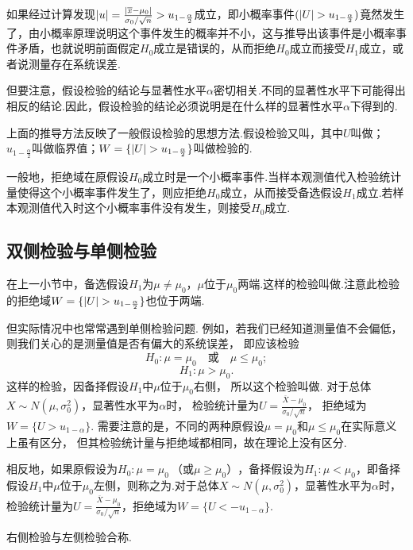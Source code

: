 如果经过计算发现\(\abs{u}=\frac{\abs{\overline{x}-\mu_0}}{\sigma_0 / \sqrt{n}}>u_{1-\frac{\alpha}{2}}\)成立，即小概率事件\((\abs{U}>u_{1-\frac{\alpha}{2}})\)竟然发生了，由小概率原理说明这个事件发生的概率并不小，这与推导出该事件是小概率事件矛盾，也就说明前面假定\(H_0\)成立是错误的，从而拒绝\(H_0\)成立而接受\(H_1\)成立，或者说测量存在系统误差.

但要注意，假设检验的结论与显著性水平\(\alpha\)密切相关.不同的显著性水平下可能得出相反的结论.因此，假设检验的结论必须说明是在什么样的显著性水平\(\alpha\)下得到的.

上面的推导方法反映了一般假设检验的思想方法.假设检验又叫，其中\(U\)叫做；\(u_{1-\frac{\alpha}{2}}\)叫做临界值；\(W=\{\abs{U}>u_{1-\frac{\alpha}{2}}\}\)叫做检验的.

一般地，拒绝域在原假设\(H_0\)成立时是一个小概率事件.当样本观测值代入检验统计量使得这个小概率事件发生了，则应拒绝\(H_0\)成立，从而接受备选假设\(H_1\)成立.若样本观测值代入时这个小概率事件没有发生，则接受\(H_0\)成立.

\subsection{双侧检验与单侧检验}
在上一小节中，备选假设\(H_1\)为\(\mu\neq\mu_0\)，\(\mu\)位于\(\mu_0\)两端.这样的检验叫做.注意此检验的拒绝域\(W=\{\abs{U}>u_{1-\frac{\alpha}{2}}\}\)也位于两端.

但实际情况中也常常遇到单侧检验问题.
例如，若我们已经知道测量值不会偏低，
则我们关心的是测量值是否有偏大的系统误差，
即应该检验\[
	H_0: \mu=\mu_0
	\quad\text{或}\quad
	\mu\leq\mu_0;
\]\[
	H_1: \mu>\mu_0.
\]
这样的检验，因备择假设\(H_1\)中\(\mu\)位于\(\mu_0\)右侧，
所以这个检验叫做.
对于总体\(X \sim N(\mu,\sigma_0^2)\)，显著性水平为\(\alpha\)时，
检验统计量为\(U = \frac{\overline{X}-\mu_0}{\sigma_0 / \sqrt{n}}\)，
拒绝域为\(W=\{U>u_{1-\alpha}\}\).
需要注意的是，不同的两种原假设\(\mu=\mu_0\)和\(\mu\leq\mu_0\)在实际意义上虽有区分，
但其检验统计量与拒绝域都相同，故在理论上没有区分.

相反地，如果原假设为\(H_0: \mu=\mu_0\ \text{（或}\mu\geq\mu_0\text{）}\)，备择假设为\(H_1: \mu<\mu_0\)，即备择假设\(H_1\)中\(\mu\)位于\(\mu_0\)左侧，则称之为.对于总体\(X \sim N(\mu,\sigma_0^2)\)，显著性水平为\(\alpha\)时，检验统计量为\(U = \frac{\overline{X}-\mu_0}{\sigma_0 / \sqrt{n}}\)，拒绝域为\(W=\{U<-u_{1-\alpha}\}\).

右侧检验与左侧检验合称.

